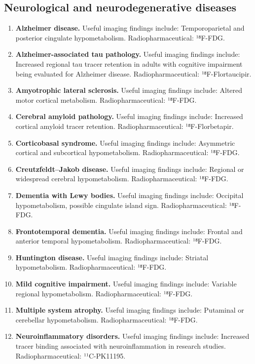 \subsection{Neurological and neurodegenerative diseases}
\begin{enumerate}[leftmargin=*,itemsep=0.45em,topsep=0.4em]
\item \textbf{Alzheimer disease.} Useful imaging findings include: Temporoparietal and posterior cingulate hypometabolism. Radiopharmaceutical: ¹⁸F-FDG.
\item \textbf{Alzheimer-associated tau pathology.} Useful imaging findings include: Increased regional tau tracer retention in adults with cognitive impairment being evaluated for Alzheimer disease. Radiopharmaceutical: ¹⁸F-Flortaucipir.
\item \textbf{Amyotrophic lateral sclerosis.} Useful imaging findings include: Altered motor cortical metabolism. Radiopharmaceutical: ¹⁸F-FDG.
\item \textbf{Cerebral amyloid pathology.} Useful imaging findings include: Increased cortical amyloid tracer retention. Radiopharmaceutical: ¹⁸F-Florbetapir.
\item \textbf{Corticobasal syndrome.} Useful imaging findings include: Asymmetric cortical and subcortical hypometabolism. Radiopharmaceutical: ¹⁸F-FDG.
\item \textbf{Creutzfeldt--Jakob disease.} Useful imaging findings include: Regional or widespread cerebral hypometabolism. Radiopharmaceutical: ¹⁸F-FDG.
\item \textbf{Dementia with Lewy bodies.} Useful imaging findings include: Occipital hypometabolism, possible cingulate island sign. Radiopharmaceutical: ¹⁸F-FDG.
\item \textbf{Frontotemporal dementia.} Useful imaging findings include: Frontal and anterior temporal hypometabolism. Radiopharmaceutical: ¹⁸F-FDG.
\item \textbf{Huntington disease.} Useful imaging findings include: Striatal hypometabolism. Radiopharmaceutical: ¹⁸F-FDG.
\item \textbf{Mild cognitive impairment.} Useful imaging findings include: Variable regional hypometabolism. Radiopharmaceutical: ¹⁸F-FDG.
\item \textbf{Multiple system atrophy.} Useful imaging findings include: Putaminal or cerebellar hypometabolism. Radiopharmaceutical: ¹⁸F-FDG.
\item \textbf{Neuroinflammatory disorders.} Useful imaging findings include: Increased tracer binding associated with neuroinflammation in research studies. Radiopharmaceutical: ¹¹C-PK11195.

\end{enumerate}
